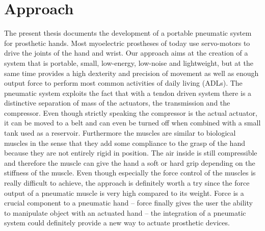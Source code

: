 \documentclass[main]{subfiles}
\begin{document}
\section{Approach}
The present thesis documents the development of a portable pneumatic system for prosthetic hands. Most myoelectric prostheses of today use servo-motors to drive the joints of the hand and wrist. Our approach aims at the creation of a system that is portable, small, low-energy, low-noise and lightweight, but at the same time provides a high dexterity and precision of movement as well as enough output force to perform most common activities of daily living (ADLs). The pneumatic system exploits the fact that with a tendon driven system there is a distinctive separation of mass of the actuators, the transmission and the compressor. Even though strictly speaking the compressor is the actual actuator, it can be moved to a belt and can even be turned off when combined with a small tank used as a reservoir. Furthermore the muscles are similar to biological muscles in the sense that they add some compliance to the grasp of the hand because they are not entirely rigid in position. The air inside is still compressible and therefore the muscle can give the hand a soft or hard grip depending on the stiffness of the muscle. Even though especially the force control of the muscles is really difficult to achieve, the approach is definitely worth a try since the force output of a pneumatic muscle is very high compared to its weight. Force is a crucial component to a pneumatic hand -- force finally gives the user the ability to manipulate object with an actuated hand -- the integration of a pneumatic system could definitely provide a new way to actuate prosthetic devices.

\end{document}
